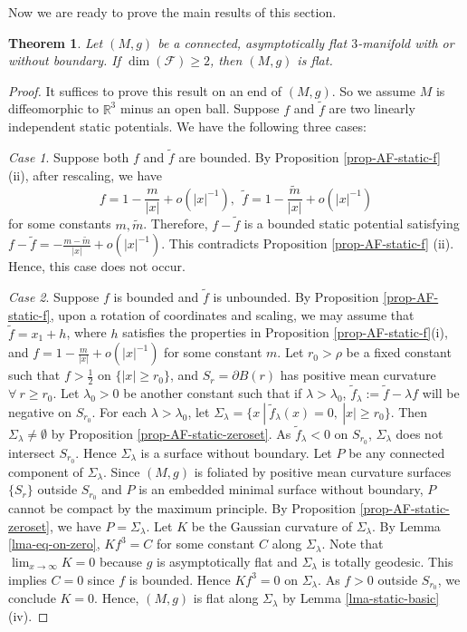 \documentclass[12pt]{amsart}
\newtheorem{thm}{Theorem}[section]
\theoremstyle{remark}
\numberwithin{equation}{section}
\newcommand{\R}{\mathbb R}
\def\p{\partial}
\def\tf{\tilde{f}}
\def\K{\mathcal{F}}
\def\l{\lambda}
\def\tf{\tilde{f}}
\begin{document}
Now we are ready to prove the main results of this section.

\begin{thm}\label{thm-dim2}
Let $(M, g)$ be a connected, asymptotically flat $3$-manifold with or without  boundary.
If $\dim(\K) \ge 2$,  then $(M, g)$ is flat.
\end{thm}


\begin{proof}
It suffices to prove this result on an end of $(M, g)$.
So we assume $M$ is diffeomorphic to $\R^3$ minus an open ball.
Suppose $ f$ and $ \tf$ are two linearly independent static potentials.
We have the following three cases:

{\it Case 1}. Suppose both $f$ and $\tf$ are  bounded. By Proposition \ref{prop-AF-static-f} (ii), after rescaling,
we have
$$
f=1-\frac{m}{|x|}+o(|x|^{-1}), \ \ \tf=1-\frac{\tilde m}{|x|}+o(|x|^{-1})
$$
for some constants $m, \tilde m$.
Therefore, $ f - \tf $ is a bounded static potential satisfying
$f-\tf=-\frac{m-\tilde m}{|x|}+o(|x|^{-1})$. This contradicts  Proposition \ref{prop-AF-static-f} (ii).
Hence,  this case does not occur.



{\it Case 2}. Suppose $f$ is bounded and $\tf$ is unbounded.
By Proposition  \ref{prop-AF-static-f},  upon a rotation of coordinates and scaling,
we may assume that $\tf=x_1+h$, where $h$
 satisfies the properties in Proposition \ref{prop-AF-static-f}(i),
and  $f=1-\frac{m}{|x|}+o(|x|^{-1})$ for some constant $m$.
Let  $r_0>\rho$ be a fixed  constant such that
 $f>\frac12$ on $\{|x|\ge r_0\}$,
 and $ S_r = \p B(r) $ has positive mean curvature $\forall \  r \ge r_0$.
Let $\lambda_0>0$ be another constant such that if $\lambda>\lambda_0$,
$\tf_\lambda:=\tf-\lambda f$ will be negative on  $S_{r_0}$. For each $ \l > \l_0$,
let $ \Sigma_\lambda = \{ x \ | \ \tf_\lambda(x) = 0, \ | x | \ge r_0 \}$.
Then $ \Sigma_\l \neq \emptyset$ by Proposition  \ref{prop-AF-static-zeroset}.
As  $ \tf_\lambda < 0 $ on $ S_{r_0}$,    $ \Sigma_\l  $ does not intersect  $ S_{r_0}$.
Hence   $ \Sigma_\l$ is a surface without boundary.
Let $P  $ be any  connected component of $ \Sigma_\l$.
Since $(M, g)$ is foliated by positive mean curvature surfaces $\{ S_r \}$ outside $ S_{r_0}$
and   $P $ is  an embedded  minimal surface without boundary, $P  $ cannot be compact by the maximum principle.
 By  Proposition  \ref{prop-AF-static-zeroset}, we have
$P = \Sigma_\l $.
Let $K$ be the Gaussian curvature of $ \Sigma_\l$.
By Lemma \ref{lma-eq-on-zero}, $ K f^3 = C$  for some constant $C$ along $\Sigma_\l$.
Note that
$ \lim_{x \rightarrow \infty} K = 0  $
because  $ g$ is asymptotically flat  and $\Sigma_\l$ is totally geodesic.
This  implies $ C = 0 $ since $f$ is bounded.
Hence $ K f^3 = 0 $ on $\Sigma_\l$.
As $ f > 0 $ outside $S_{r_0}$, we conclude $ K = 0 $. Hence, $(M, g)$ is flat along  $\Sigma_\l$
by Lemma \ref{lma-static-basic}(iv).


\end{proof}
\end{document}
